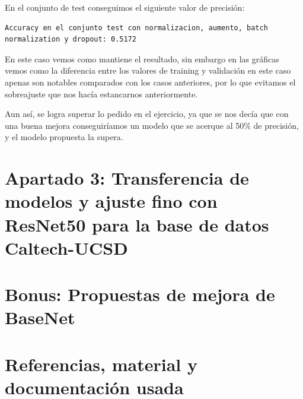 \documentclass[12pt, spanish]{article}
\begin{document}
En el conjunto de test conseguimos el siguiente valor de precisión:

\begin{lstlisting}
Accuracy en el conjunto test con normalizacion, aumento, batch normalization y dropout: 0.5172
\end{lstlisting}

En este caso vemos como mantiene el resultado, sin embargo en las gráficas vemos como la diferencia entre los valores de training y validación en este caso apenas son notables comparados con los casos anteriores, por lo que evitamos el sobreajuste que nos hacía estancarnos anteriormente.

Aun así, se logra superar lo pedido en el ejercicio, ya que se nos decía que con una buena mejora conseguiríamos un modelo que se acerque al 50\% de precisión, y el modelo propuesta la supera.



\newpage






\section{Apartado 3: Transferencia de modelos y ajuste fino con ResNet50 para la base de datos Caltech-UCSD}








\section{Bonus: Propuestas de mejora de BaseNet}











\newpage

\section{Referencias, material y documentación usada}
\end{document}
